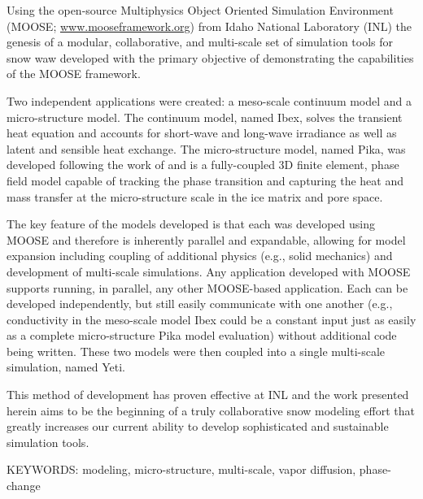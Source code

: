 Using the open-source Multiphysics Object Oriented Simulation Environment (MOOSE; \url{www.mooseframework.org}) from Idaho National Laboratory (INL) the genesis of a modular, collaborative, and multi-scale set of simulation tools for snow waw developed with the primary objective of demonstrating the capabilities of the MOOSE framework.

Two independent applications were created: a meso-scale continuum model and a micro-structure model. The continuum model, named Ibex, solves the transient heat equation and accounts for short-wave and long-wave irradiance as well as latent and sensible heat exchange. The micro-structure model, named Pika, was developed following the work of \citet{kaempfer2009phase} and is a fully-coupled 3D finite element, phase field model capable of tracking the phase transition and capturing the heat and mass transfer at the micro-structure scale in the ice matrix and pore space.

The key feature of the models developed is that each was developed using MOOSE and therefore is inherently parallel and expandable, allowing for model expansion including coupling of additional physics (e.g., solid mechanics) and development of multi-scale simulations. Any application developed with MOOSE supports running, in parallel, any other MOOSE-based application. Each can be developed independently, but still easily communicate with one another (e.g., conductivity in the meso-scale model Ibex could be a constant input just as easily as a complete micro-structure Pika model evaluation) without additional code being written.  These two models were then coupled into a single multi-scale simulation, named Yeti.

This method of development has proven effective at INL and the work presented herein aims to be the beginning of a truly collaborative snow modeling effort that greatly increases our current ability to develop sophisticated and sustainable simulation tools.

\bigskip
\noindent KEYWORDS: modeling, micro-structure, multi-scale, vapor diffusion, phase-change
